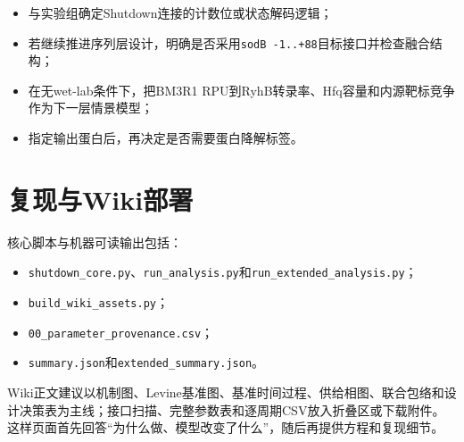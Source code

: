 \documentclass[UTF8,a4paper,11pt,fontset=windows]{ctexart}
\begin{document}
\begin{itemize}
\item 与实验组确定Shutdown连接的计数位或状态解码逻辑；
\item 若继续推进序列层设计，明确是否采用\nolinkurl{sodB -1..+88}目标接口并检查融合结构；
\item 在无wet-lab条件下，把BM3R1 RPU到RyhB转录率、Hfq容量和内源靶标竞争作为下一层情景模型；
\item 指定输出蛋白后，再决定是否需要蛋白降解标签。
\end{itemize}

\section{复现与Wiki部署}
核心脚本与机器可读输出包括：
\begin{itemize}
\item \nolinkurl{shutdown_core.py}、\nolinkurl{run_analysis.py}和\nolinkurl{run_extended_analysis.py}；
\item \nolinkurl{build_wiki_assets.py}；
\item \nolinkurl{00_parameter_provenance.csv}；
\item \nolinkurl{summary.json}和\nolinkurl{extended_summary.json}。
\end{itemize}

Wiki正文建议以机制图、Levine基准图、基准时间过程、供给相图、联合包络和设计决策表为主线；接口扫描、完整参数表和逐周期CSV放入折叠区或下载附件。这样页面首先回答“为什么做、模型改变了什么”，随后再提供方程和复现细节。
\end{document}
